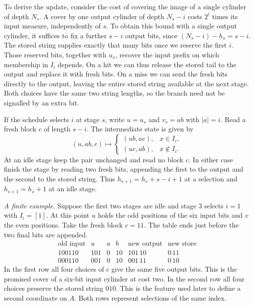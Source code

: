 \documentclass[12pt,reqno]{amsart}
\begin{document}
To derive the update, consider the cost of covering the image of a
single cylinder of depth $N_s$. A cover by one output cylinder of depth
$N_s-i$ costs $2^i$ times its input measure, independently of $s$.
To obtain this bound with a single output cylinder, it suffices to fix
a further $s-i$ output bits, since $(N_s-i)-h_s=s-i$. The stored
string supplies exactly that many bits once we reserve the first $i$.
Those reserved bits, together with $u_s$, recover the input prefix on
which membership in $I_i$ depends. On a hit we can thus release the
stored tail to the output and replace it with fresh bits. On a miss
we can send the fresh bits directly to the output, leaving the entire
stored string available at the next stage. Both choices have the same
two string lengths, so the branch need not be signalled by an extra bit.

If the schedule selects $i$ at stage $s$, write $u=u_s$ and $v_s=ab$
with $|a|=i$. Read a fresh block $c$ of length $s-i$. The intermediate
state is given by
\begin{equation}\label{eq:update}
(u,ab,c)\longmapsto
\begin{cases}
 (ub,ac),& x\in I_i,\\
 (uc,ab),& x\notin I_i .
\end{cases}
\end{equation}
At an idle stage keep the pair unchanged and read no block $c$. In either
case finish the stage by reading two fresh bits, appending the first to the
output and the second to the stored string. Thus $h_{s+1}=h_s+s-i+1$ at
a selection and $h_{s+1}=h_s+1$ at an idle stage.

\smallskip
\noindent\emph{A finite example.}
Suppose the first two stages are idle and stage $3$ selects $i=1$
with $I_i=[1]$. At this point $u$ holds the odd positions of the
six input bits and $v$ the even positions. Take the fresh block $c=11$.
The table ends just before the two final bits are appended.
\[
\begin{array}{c|ccc|cc}
 \text{old input} & u & a & b & \text{new output} & \text{new store}\\ \hline
 100110 &101&0&10&101\,10&0\,11\\
 000110 &001&0&10&001\,11&0\,10
\end{array}
\]
In the first row all four choices of $c$ give the same five output
bits. This is the promised cover of a six-bit input cylinder at cost
two. In the second row all four choices preserve the stored string
$010$. This is the feature used later to define a second coordinate on
$A$. Both rows represent selections of the same index.
\end{document}
